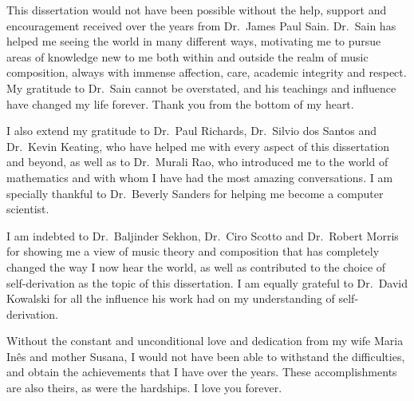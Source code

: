 This dissertation would not have been possible without the help, support and encouragement received over the years from Dr.~James Paul Sain. Dr.~Sain has helped me seeing the world in many different ways, motivating me to pursue areas of knowledge new to me both within and outside the realm of music composition, always with immense affection, care, academic integrity and respect. My gratitude to Dr.~Sain cannot be overstated, and his teachings and influence have changed my life forever. Thank you from the bottom of my heart.

I also extend my gratitude to Dr.~Paul Richards, Dr.~Silvio dos Santos and Dr.~Kevin Keating, who have helped me with every aspect of this dissertation and beyond, as well as to Dr.~Murali Rao, who introduced me to the world of mathematics and with whom I have had the most amazing conversations. I am specially thankful to Dr.~Beverly Sanders for helping me become a computer scientist.

I am indebted to Dr.~Baljinder Sekhon, Dr.~Ciro Scotto and Dr.~Robert Morris for showing me a view of music theory and composition that has completely changed the way I now hear the world, as well as contributed to the choice of self-derivation as the topic of this dissertation. I am equally grateful to Dr.~David Kowalski for all the influence his work had on my understanding of self-derivation. %

Without the constant and unconditional love and dedication from my wife Maria In\^{e}s and mother Susana, I would not have been able to withstand the difficulties, and obtain the achievements that I have over the years. These accomplishments are also theirs, as were the hardships. I love you forever.